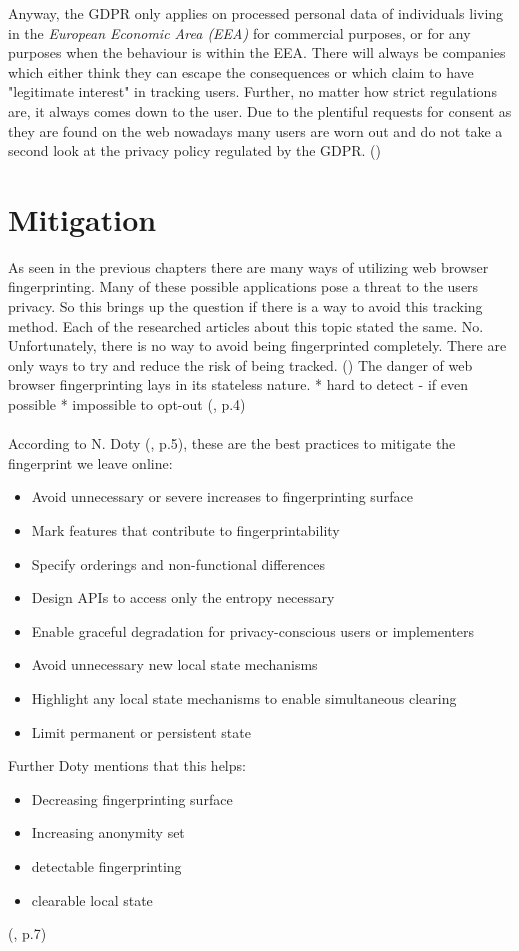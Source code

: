 Anyway, the GDPR only applies on processed personal data of individuals living in the \textit{European Economic Area (EEA)} for commercial purposes, or for any purposes when the behaviour is within the EEA. There will always be companies which either think they can escape the consequences or which claim to have "legitimate interest" in tracking users. Further, no matter how strict regulations are, it always comes down to the user. Due to the plentiful requests for consent as they are found on the web nowadays many users are worn out and do not take a second look at the privacy policy regulated by the GDPR. (\textcite{miele18})

\section{Mitigation }
As seen in the previous chapters there are many ways of utilizing web browser fingerprinting. Many of these possible applications pose a threat to the users privacy. So this brings up the question if there is a way to avoid this tracking method. Each of the researched articles about this topic stated the same. No. Unfortunately, there is no way to avoid being fingerprinted completely. There are only ways to try and reduce the risk of being tracked. (\textcite{web17})
The danger of web browser fingerprinting lays in its stateless nature. 
* hard to detect - if even possible
* impossible to opt-out
(\textcite{upi15}, p.4)
 \\\\
According to N. Doty (\textcite{doty18}, p.5), these are the best practices to mitigate the fingerprint we leave online: 
\begin{itemize}
	\item Avoid unnecessary or severe increases to fingerprinting surface
	\item Mark features that contribute to fingerprintability
	\item Specify orderings and non-functional differences
	\item Design APIs to access only the entropy necessary
	\item Enable graceful degradation for privacy-conscious users or implementers
	\item Avoid unnecessary new local state mechanisms
	\item Highlight any local state mechanisms to enable simultaneous clearing
	\item Limit permanent or persistent state\\
\end{itemize}
Further Doty mentions that this helps: 
\begin{itemize}
	\item Decreasing fingerprinting surface
	\item Increasing anonymity set
	\item detectable fingerprinting
	\item clearable local state
\end{itemize}
(\textcite{doty18}, p.7)\\

